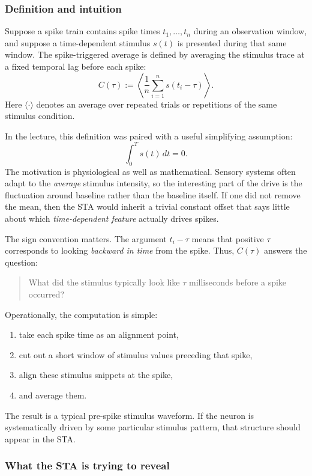 \documentclass[11pt]{article}
\begin{document}
\subsubsection{Definition and intuition}

Suppose a spike train contains spike times $t_1,\dots,t_n$ during an observation window, and suppose a time-dependent stimulus $s(t)$ is presented during that same window. The spike-triggered average is defined by averaging the stimulus trace at a fixed temporal lag before each spike:
\[
C(\tau) := \left\langle \frac{1}{n}\sum_{i=1}^{n} s(t_i-\tau)\right\rangle .
\]
Here $\langle \cdot \rangle$ denotes an average over repeated trials or repetitions of the same stimulus condition.

In the lecture, this definition was paired with a useful simplifying assumption:
\[
\int_0^T s(t)\,dt = 0.
\]
The motivation is physiological as well as mathematical. Sensory systems often adapt to the \emph{average} stimulus intensity, so the interesting part of the drive is the fluctuation around baseline rather than the baseline itself. If one did not remove the mean, then the STA would inherit a trivial constant offset that says little about which \emph{time-dependent feature} actually drives spikes.

The sign convention matters. The argument $t_i-\tau$ means that positive $\tau$ corresponds to looking \emph{backward in time} from the spike. Thus, $C(\tau)$ answers the question:
\begin{quote}
What did the stimulus typically look like $\tau$ milliseconds before a spike occurred?
\end{quote}

Operationally, the computation is simple:
\begin{enumerate}
    \item take each spike time as an alignment point,
    \item cut out a short window of stimulus values preceding that spike,
    \item align these stimulus snippets at the spike,
    \item and average them.
\end{enumerate}

The result is a typical pre-spike stimulus waveform. If the neuron is systematically driven by some particular stimulus pattern, that structure should appear in the STA.

\subsubsection{What the STA is trying to reveal}
\end{document}
